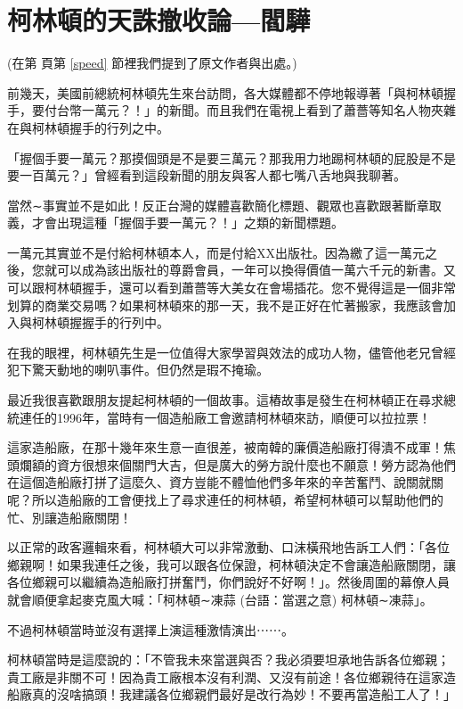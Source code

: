 \section{柯林頓的天誅撤收論—閻驊}
(在第 \pageref{speed} 頁第 \ref{speed} 節裡我們提到了原文作者與出處。)



前幾天，美國前總統柯林頓先生來台訪問，各大媒體都不停地報導著「與柯林頓握手，要付台幣一萬元？！」的新聞。而且我們在電視上看到了蕭薔等知名人物夾雜在與柯林頓握手的行列之中。

「握個手要一萬元？那摸個頭是不是要三萬元？那我用力地踢柯林頓的屁股是不是要一百萬元？」曾經看到這段新聞的朋友與客人都七嘴八舌地與我聊著。

當然∼事實並不是如此！反正台灣的媒體喜歡簡化標題、觀眾也喜歡跟著斷章取義，才會出現這種「握個手要一萬元？！」之類的新聞標題。

一萬元其實並不是付給柯林頓本人，而是付給XX出版社。因為繳了這一萬元之後，您就可以成為該出版社的尊爵會員，一年可以換得價值一萬六千元的新書。又可以跟柯林頓握手，還可以看到蕭薔等大美女在會場插花。您不覺得這是一個非常划算的商業交易嗎？如果柯林頓來的那一天，我不是正好在忙著搬家，我應該會加入與柯林頓握握手的行列中。

在我的眼裡，柯林頓先生是一位值得大家學習與效法的成功人物，儘管他老兄曾經犯下驚天動地的喇叭事件。但仍然是瑕不掩瑜。

最近我很喜歡跟朋友提起柯林頓的一個故事。這樁故事是發生在柯林頓正在尋求總統連任的1996年，當時有一個造船廠工會邀請柯林頓來訪，順便可以拉拉票！

這家造船廠，在那十幾年來生意一直很差，被南韓的廉價造船廠打得潰不成軍！焦頭爛額的資方很想來個關門大吉，但是廣大的勞方說什麼也不願意！勞方認為他們在這個造船廠打拼了這麼久、資方豈能不體恤他們多年來的辛苦奮鬥、說關就關呢？所以造船廠的工會便找上了尋求連任的柯林頓，希望柯林頓可以幫助他們的忙、別讓造船廠關閉！

以正常的政客邏輯來看，柯林頓大可以非常激動、口沫橫飛地告訴工人們：「各位鄉親啊！如果我連任之後，我可以跟各位保證，柯林頓決定不會讓造船廠關閉，讓各位鄉親可以繼續為造船廠打拼奮鬥，你們說好不好啊！」。然後周圍的幕僚人員就會順便拿起麥克風大喊：「柯林頓∼凍蒜 (台語：當選之意) 柯林頓∼凍蒜」。

不過柯林頓當時並沒有選擇上演這種激情演出⋯⋯。

柯林頓當時是這麼說的：「不管我未來當選與否？我必須要坦承地告訴各位鄉親；貴工廠是非關不可！因為貴工廠根本沒有利潤、又沒有前途！各位鄉親待在這家造船廠真的沒啥搞頭！我建議各位鄉親們最好是改行為妙！不要再當造船工人了！」

